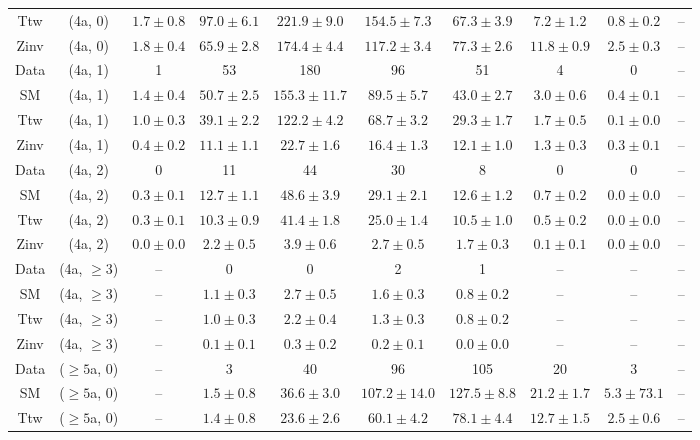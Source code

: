 \begin{table}[h!]
{\begin{tabular}{cccccccccc}
	Ttw & (4a, 0) & $1.7\pm 0.8$ & $97.0\pm 6.1$ & $221.9\pm 9.0$ & $154.5\pm 7.3$ & $67.3\pm 3.9$ & $7.2\pm 1.2$ & $0.8\pm 0.2$ & -- \\[0.5ex] 
	Zinv & (4a, 0) & $1.8\pm 0.4$ & $65.9\pm 2.8$ & $174.4\pm 4.4$ & $117.2\pm 3.4$ & $77.3\pm 2.6$ & $11.8\pm 0.9$ & $2.5\pm 0.3$ & -- \\[0.5ex] 
	Data & (4a, 1) & 1 & 53 & 180 & 96 & 51 & 4 & 0 & -- \\[0.5ex] 
	SM & (4a, 1) & $1.4\pm 0.4$ & $50.7\pm 2.5$ & $155.3\pm 11.7$ & $89.5\pm 5.7$ & $43.0\pm 2.7$ & $3.0\pm 0.6$ & $0.4\pm 0.1$ & -- \\[0.5ex] 
	Ttw & (4a, 1) & $1.0\pm 0.3$ & $39.1\pm 2.2$ & $122.2\pm 4.2$ & $68.7\pm 3.2$ & $29.3\pm 1.7$ & $1.7\pm 0.5$ & $0.1\pm 0.0$ & -- \\[0.5ex] 
	Zinv & (4a, 1) & $0.4\pm 0.2$ & $11.1\pm 1.1$ & $22.7\pm 1.6$ & $16.4\pm 1.3$ & $12.1\pm 1.0$ & $1.3\pm 0.3$ & $0.3\pm 0.1$ & -- \\[0.5ex] 
	Data & (4a, 2) & 0 & 11 & 44 & 30 & 8 & 0 & 0 & -- \\[0.5ex] 
	SM & (4a, 2) & $0.3\pm 0.1$ & $12.7\pm 1.1$ & $48.6\pm 3.9$ & $29.1\pm 2.1$ & $12.6\pm 1.2$ & $0.7\pm 0.2$ & $0.0\pm 0.0$ & -- \\[0.5ex] 
	Ttw & (4a, 2) & $0.3\pm 0.1$ & $10.3\pm 0.9$ & $41.4\pm 1.8$ & $25.0\pm 1.4$ & $10.5\pm 1.0$ & $0.5\pm 0.2$ & $0.0\pm 0.0$ & -- \\[0.5ex] 
	Zinv & (4a, 2) & $0.0\pm 0.0$ & $2.2\pm 0.5$ & $3.9\pm 0.6$ & $2.7\pm 0.5$ & $1.7\pm 0.3$ & $0.1\pm 0.1$ & $0.0\pm 0.0$ & -- \\[0.5ex] 
	Data & (4a, $\ge3$) & -- & 0 & 0 & 2 & 1 & -- & -- & -- \\[0.5ex] 
	SM & (4a, $\ge3$) & -- & $1.1\pm 0.3$ & $2.7\pm 0.5$ & $1.6\pm 0.3$ & $0.8\pm 0.2$ & -- & -- & -- \\[0.5ex] 
	Ttw & (4a, $\ge3$) & -- & $1.0\pm 0.3$ & $2.2\pm 0.4$ & $1.3\pm 0.3$ & $0.8\pm 0.2$ & -- & -- & -- \\[0.5ex] 
	Zinv & (4a, $\ge3$) & -- & $0.1\pm 0.1$ & $0.3\pm 0.2$ & $0.2\pm 0.1$ & $0.0\pm 0.0$ & -- & -- & -- \\[0.5ex] 
	Data & ($\ge5$a, 0) & -- & 3 & 40 & 96 & 105 & 20 & 3 & -- \\[0.5ex] 
	SM & ($\ge5$a, 0) & -- & $1.5\pm 0.8$ & $36.6\pm 3.0$ & $107.2\pm 14.0$ & $127.5\pm 8.8$ & $21.2\pm 1.7$ & $5.3\pm 73.1$ & -- \\[0.5ex] 
	Ttw & ($\ge5$a, 0) & -- & $1.4\pm 0.8$ & $23.6\pm 2.6$ & $60.1\pm 4.2$ & $78.1\pm 4.4$ & $12.7\pm 1.5$ & $2.5\pm 0.6$ & -- \\[0.5ex] 

\end{tabular}}
\end{table}
